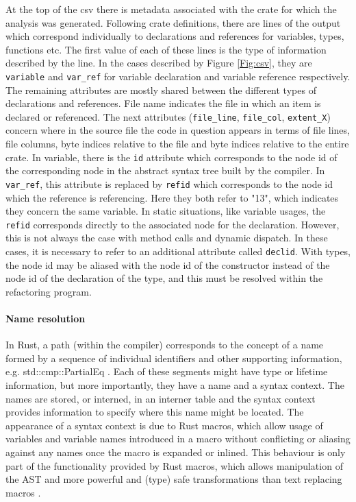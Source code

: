 At the top of the csv there is metadata associated with the crate for which the analysis was generated. Following crate definitions, there are lines of the output which correspond individually to declarations and references for variables, types, functions etc. The first value of each of these lines is the type of information described by the line. In the cases described by Figure \ref{Fig:csv}, they are {\verb|variable|} and {\verb|var_ref|} for variable declaration and variable reference respectively. The remaining attributes are mostly shared between the different types of declarations and references. File name indicates the file in which an item is declared or referenced. The next attributes ({\verb|file_line|}, {\verb|file_col|}, {\verb|extent_X|}) concern where in the source file the code in question appears in terms of file lines, file columns, byte indices relative to the file and byte indices relative to the entire crate. In variable, there is the {\verb|id|} attribute which corresponds to the node id of the corresponding node in the abstract syntax tree built by the compiler. In {\verb|var_ref|}, this attribute is replaced by {\verb|refid|} which corresponds to the node id which the reference is referencing. Here they both refer to "13", which indicates they concern the same variable. In static situations, like variable usages, the {\verb|refid|} corresponds directly to the associated node for the declaration. However, this is not always the case with method calls and dynamic dispatch. In these cases, it is necessary to refer to an additional attribute called {\verb|declid|}. With types, the node id may be aliased with the node id of the constructor instead of the node id of the declaration of the type, and this must be resolved within the refactoring program.

\paragraph{Name resolution}
In Rust, a path (within the compiler) corresponds to the concept of a name formed by a sequence of individual identifiers and other supporting information, e.g. std::cmp::PartialEq \cite{docpath15}. Each of these segments might have type or lifetime information, but more importantly, they have a name and a syntax context. The names are stored, or interned, in an interner table and the syntax context provides information to specify where this name might be located. The appearance of a syntax context is due to Rust macros, which allow usage of variables and variable names introduced in a macro without conflicting or aliasing against any names once the macro is expanded or inlined. This behaviour is only part of the functionality provided by Rust macros, which allows manipulation of the AST and more powerful and (type) safe transformations than text replacing macros \cite{keep15}.

